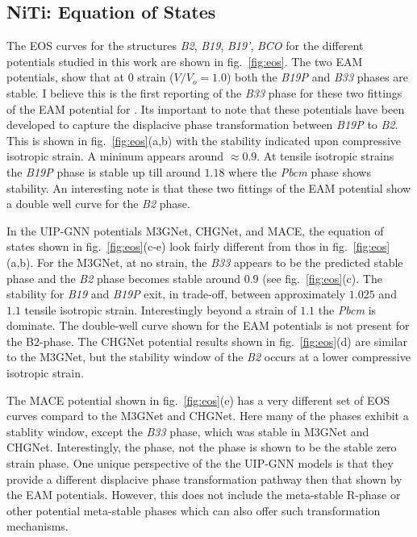 \documentclass[preprint,colorlinks=true,linkcolor=black,citecolor=black]{elsarticle}
\begin{document}
\subsection{NiTi: Equation of States}
\label{subsec:nitieos}

The EOS curves for the  structures \textit{B2}, \textit{B19}, \textit{B19'}, \textit{BCO} for the different potentials studied in this work are shown in fig.~\ref{fig:eos}. The two EAM potentials, show that at 0 strain ($V/V_o = 1.0$) both the \textit{B19P} and \textit{B33} phases are stable. I believe this is the first reporting of the \textit{B33} phase for these two fittings of the EAM potential for . Its important to note that these potentials have been developed to capture the displacive phase transformation between \textit{B19P} to \textit{B2}. This is shown in fig.~\ref{fig:eos}(a,b) with the stability indicated upon compressive isotropic strain. A mininum appears around $\approx 0.9$. At tensile isotropic strains the \textit{B19P} phase is stable up till around $1.18$ where the \textit{Pbcm} phase shows stability. An interesting note is that these two fittings of the EAM potential show a double well curve for the \textit{B2} phase. \par

In the UIP-GNN potentials M3GNet, CHGNet, and MACE, the equation of states shown in fig.~\ref{fig:eos}(c-e) look fairly different from thos in fig.~\ref{fig:eos}(a,b). For the M3GNet,  at no strain, the \textit{B33} appears to be the predicted stable phase and the \textit{B2} phase becomes stable around $0.9$ (see fig.~\ref{fig:eos}(c). The stability for \textit{B19} and \textit{B19P} exit, in trade-off, between approximately $1.025$ and $1.1$ tensile isotropic strain. Interestingly beyond a strain of $1.1$ the \textit{Pbcm} is dominate. The double-well curve shown for the EAM potentials is not present for the B2-phase. The CHGNet potential results shown in fig.~\ref{fig:eos}(d) are similar to the M3GNet, but the stability window of the \textit{B2} occurs at a lower compressive isotropic strain. \par

The MACE potential shown in fig.~\ref{fig:eos}(e) has a very different set of EOS curves compard to the M3GNet and CHGNet. Here many of the phases exhibit a stablity window, except the \textit{B33} phase, which was stable in M3GNet and CHGNet. Interestingly, the  phase, not the  phase is shown to be the stable zero strain phase. One unique perspective of the the UIP-GNN models is that they provide a different displacive phase transformation pathway then that shown by the EAM potentials. However, this does not include the meta-stable R-phase or other potential meta-stable phases which can also offer such transformation mechanisms. \par
\end{document}
